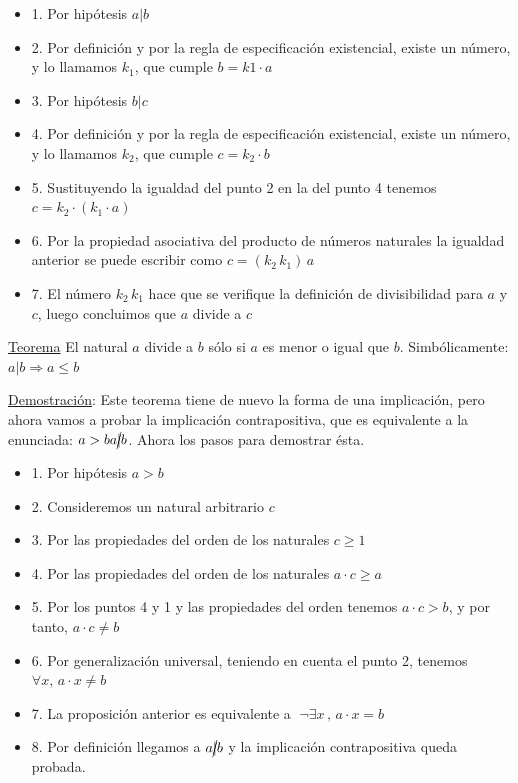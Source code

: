 \begin{itemize}
	
\item 1. Por hipótesis $a|b$ 

\item 2. Por definición y por la regla de especificación existencial, existe un número, y lo llamamos $k_1$, que cumple $b = k1\cdot a$ 

\item 3. Por hipótesis $b|c$ 

\item 4. Por definición y por la regla de especificación existencial, existe un número, y lo llamamos $k_2$, que cumple $c = k_2 \cdot b$ 

\item 5. Sustituyendo la igualdad del punto 2 en la del punto 4 tenemos $c = k_2 \cdot (k_1 \cdot a)$

\item 6. Por la propiedad asociativa del producto de números naturales la igualdad anterior se puede escribir como $c = (k_2\, k_1)\, a$

\item 7. El número $k_2\, k_1$ hace que se verifique la definición de divisibilidad para $a$ y $c$, luego concluimos que $a$ divide a $c$ 
\end{itemize}

\rightline{$\Box$}

\underline{Teorema} El natural $a$ divide a $b$ sólo si $a$ es menor o igual que $b$. Simbólicamente: $a|b \Rightarrow a 	\le  b$

\underline{Demostración}: Este teorema tiene de nuevo la forma de una implicación, pero ahora vamos a probar la implicación contrapositiva, que es equivalente a la enunciada:  $a > b  a \cancel{|} b$. Ahora los pasos para demostrar ésta.
\begin{itemize}
\item 1. Por hipótesis $a > b$ 

\item 2. Consideremos un natural arbitrario $c$ 

\item 3. Por las propiedades del orden de los naturales $c \ge  1$ 

\item 4. Por las propiedades del orden de los naturales $a\cdot c \ge  a$ 

\item 5. Por los puntos 4 y 1 y las propiedades del orden tenemos $a \cdot c > b$, y por tanto, $a\cdot c \neq  b$ 

\item 6. Por generalización universal, teniendo en cuenta el punto 2, tenemos  $\forall  x,\,   a \cdot x  \neq b$ 

\item 7. La proposición anterior es equivalente a $ \; \neg \exists x\, ,\,  a \cdot x = b$ 

\item 8. Por definición llegamos a   $a \cancel{|} b$ y la implicación contrapositiva queda probada.
\end{itemize}

